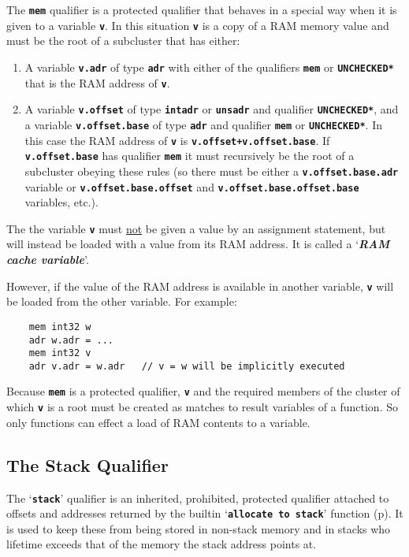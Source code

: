 \documentclass[12pt]{article}
\makeatletter
\newcommand{\TT}[1]{{\tt \bfseries #1}}
\newcommand{\key}[1]{{\bf \em #1}\index{#1}}
\newcommand{\ttkey}[1]{\TT{#1}\index{#1@{\tt #1}}}
\newcommand{\pagref}[1]{p\pageref{#1}}
\newcommand{\EOL}{\penalty \exhyphenpenalty}
\newenvironment{indpar}[1][0.3in]%
	{\begin{list}{}%
		     {\setlength{\itemsep}{0in}%
		      \setlength{\topsep}{0in}%
		      \setlength{\parsep}{1ex}%
		      \setlength{\labelwidth}{#1}%
		      \setlength{\leftmargin}{#1}%
		      \addtolength{\leftmargin}{\labelsep}}%
	 \item}%
	{\end{list}}
\makeatother
\begin{document}
The \ttkey{mem} qualifier is a protected qualifier that behaves
in a special way when it is given to a variable \TT{v}.
In this situation \TT{v} is a copy of a RAM memory value and
must be the root of a subcluster that
has either:
\begin{enumerate}
\item
A variable \TT{v.adr} of type \TT{adr} with either of the qualifiers
\TT{mem} or \TT{*UNCHECKED*} that is the RAM address of \TT{v}.

\item
A variable \TT{v.offset} of type \TT{intadr} or \TT{unsadr} and
qualifier \TT{*UNCHECKED*}, and
a variable \TT{v.offset.base} of type \TT{adr} and qualifier \TT{mem}
or \TT{*UNCHECKED*}.
In this case the RAM address of \TT{v} is \TT{v.offset+v.offset.base}.
If \TT{v.offset.base} has qualifier \TT{mem} it must recursively be
the root of a subcluster obeying
these rules (so there must be either a \TT{v.offset.base.adr} variable
or \TT{v.offset.base.offset} and \TT{v.offset.base\EOL .offset.base}
variables, etc.).
\end{enumerate}
The the
variable \TT{v} must \underline{not} be given a value by an
assignment statement, but will instead be loaded with a value
from its RAM address.  It is called a `\key{RAM cache variable}'.

However, if the value of the RAM address is available in another
variable, \TT{v} will be loaded from the other variable.
For example:
\begin{indpar}\begin{verbatim}
    mem int32 w
    adr w.adr = ...
    mem int32 v
    adr v.adr = w.adr   // v = w will be implicitly executed
\end{verbatim}\end{indpar}

Because \TT{mem} is a protected qualifier, \TT{v} and the required
members of the cluster of which \TT{v} is a root
must be created as matches to result variables of a function.
So only functions can effect a load of RAM contents to a variable.


\subsection{The Stack Qualifier}
\label{THE-STACK-QUALIFIER}

The `\ttkey{stack}' qualifier is an inherited, prohibited,
protected qualifier
attached to offsets and addresses
returned by the builtin `\TT{allocate to stack}'
function (\pagref{ALLOCATE-TO-STACK}).
It is used to keep these from being stored in
non-stack memory and in stacks who lifetime exceeds that of the
memory the stack address points at.
\end{document}
